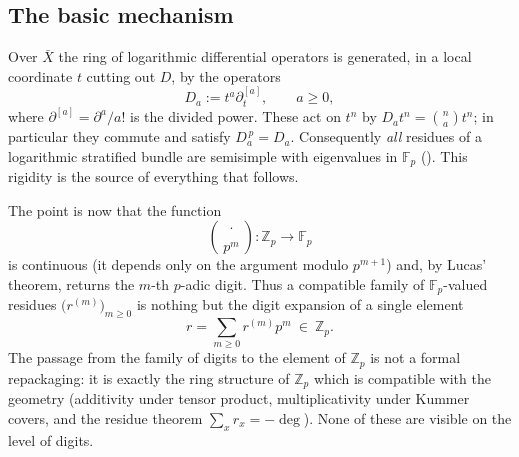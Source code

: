 \documentclass[11pt,reqno]{amsart}
\newcommand{\Zp}{\mathbb{Z}_p}
\newcommand{\Fp}{\mathbb{F}_p}
\theoremstyle{plain}
\theoremstyle{definition}
\theoremstyle{remark}
\numberwithin{equation}{section}
\begin{document}
\subsection{The basic mechanism}
Over $\bar X$ the ring of logarithmic differential operators is generated,
in a local coordinate $t$ cutting out $D$, by the operators
\[
   D_a:=t^{a}\partial_t^{[a]},\qquad a\ge0 ,
\]
where $\partial^{[a]}=\partial^a/a!$ is the divided power.  These act on
$t^n$ by $D_a t^n=\binom{n}{a}t^n$; in particular they commute and satisfy
$D_a^{\,p}=D_a$.  Consequently \emph{all} residues of a logarithmic
stratified bundle are semisimple with eigenvalues in $\Fp$
().  This rigidity is the source of everything that
follows.

The point is now that the function
\[
   \binom{\cdot}{p^m}\colon \Zp\longrightarrow\Fp
\]
is continuous (it depends only on the argument modulo $p^{m+1}$) and, by
Lucas' theorem, returns the $m$-th $p$-adic digit.  Thus a compatible
family of $\Fp$-valued residues $\bigl(r^{(m)}\bigr)_{m\ge0}$ is nothing
but the digit expansion of a single element
\[
   r=\sum_{m\ge0}r^{(m)}p^{m}\ \in\ \Zp .
\]
The passage from the family of digits to the element of $\Zp$ is not a
formal repackaging: it is exactly the ring structure of $\Zp$ which is
compatible with the geometry (additivity under tensor product,
multiplicativity under Kummer covers, and the residue theorem
$\sum_x r_x=-\deg$).  None of these are visible on the level of digits.
\end{document}
